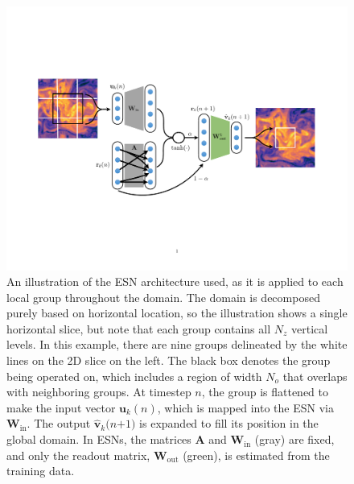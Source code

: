 \documentclass[draft]{agujournal2019}
\newcommand{\state}{\mathbf{v}}
\newcommand{\inputstate}{\mathbf{u}}
\newcommand{\Wout}{\mathbf{W}_\text{out}}
\newcommand{\adjacency}{\mathbf{A}}
\newcommand{\inputmatrix}{\mathbf{W}_\text{in}}
\newcommand{\localinputstate}{\inputstate_{k}}
\newcommand{\localoutput}{\hat{\state}_{k}}
\newcommand{\nvertical}{N_{z}}
\newcommand{\noverlap}{N_{o}}
\begin{document}
\begin{figure}
    \centering
    \includegraphics[width=\textwidth,
    trim={1in 2.4in 1in 2.4in}, clip
    ]{labeled-esn-diagram.pdf}
    \caption{An illustration of the ESN architecture used, as it
        is applied to each local group throughout the domain.
        The domain is decomposed purely based on horizontal location, so the
        illustration shows a single horizontal slice, but note that each group
        contains all $\nvertical$ vertical levels.
        In this example, there are nine groups delineated by the white lines on
        the 2D slice on the left.
        The black box denotes the group being operated on, which includes a
        region of width $\noverlap$ that overlaps with neighboring groups.
        At timestep $n$, the group is flattened to make the input vector
        $\localinputstate(n)$, which is
        mapped into the ESN via $\inputmatrix$.
        The output $\localoutput($$n$$+$$1$$)$ is expanded to fill its position in the global
        domain.
        In ESNs, the matrices $\adjacency$ and $\inputmatrix$ (gray) are fixed, and only
        the readout matrix, $\Wout$ (green), is estimated from the training data.
    }
    \label{fig:esn-diagram}
\end{figure}
\end{document}
